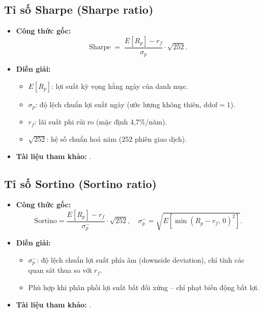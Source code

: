 \documentclass[12pt,a4paper,openany,oneside]{report}
\numberwithin{equation}{chapter}
\begin{document}
\subsection{Tỉ số Sharpe (Sharpe ratio)}
\begin{itemize}[leftmargin=18pt,topsep=2pt,itemsep=3pt]
  \item \textbf{Công thức gốc:}
        \begin{equation}
          \mathrm{Sharpe} \;=\; \frac{E[R_p] - r_f}{\sigma_p} \cdot \sqrt{252}.
          \label{eq:sharpe}
        \end{equation}
  \item \textbf{Diễn giải:}
        \begin{itemize}[leftmargin=14pt,topsep=2pt,itemsep=1pt]
          \item $E[R_p]$: lợi suất kỳ vọng hằng ngày của danh mục.
          \item $\sigma_p$: độ lệch chuẩn lợi suất ngày (ước lượng không
                thiên, $\mathrm{ddof} = 1$).
          \item $r_f$: lãi suất phi rủi ro (mặc định 4,7\%/năm).
          \item $\sqrt{252}$: hệ số chuẩn hoá năm (252 phiên giao dịch).
        \end{itemize}
  \item \textbf{Tài liệu tham khảo:} \citet{Sharpe1966}.
\end{itemize}

\subsection{Tỉ số Sortino (Sortino ratio)}
\begin{itemize}[leftmargin=18pt,topsep=2pt,itemsep=3pt]
  \item \textbf{Công thức gốc:}
        \begin{equation}
          \mathrm{Sortino} = \frac{E[R_p] - r_f}{\sigma_p^{-}}\cdot \sqrt{252},
          \quad
          \sigma_p^{-} = \sqrt{E\!\left[\min(R_p - r_f,\,0)^2\right]}.
          \label{eq:sortino}
        \end{equation}
  \item \textbf{Diễn giải:}
        \begin{itemize}[leftmargin=14pt,topsep=2pt,itemsep=1pt]
          \item $\sigma_p^{-}$: độ lệch chuẩn lợi suất phía âm (downside
                deviation), chỉ tính các quan sát thua so với $r_f$.
          \item Phù hợp khi phân phối lợi suất bất đối xứng -- chỉ phạt
                biến động bất lợi.
        \end{itemize}
  \item \textbf{Tài liệu tham khảo:} \citet{SortinoPrice1994}.
\end{itemize}
\end{document}
